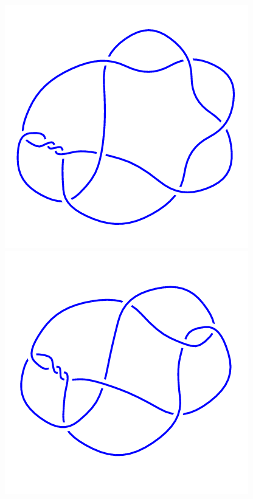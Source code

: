 \begin{figure}[H]
	\begin{minipage}[b]{.18\linewidth}
		\centering
		\includegraphics[width=\linewidth]{../data/10_17.png}
	\end{minipage}
	\begin{minipage}[b]{.18\linewidth}
		\centering
		\includegraphics[width=\linewidth]{../data/10_18.png}

\end{minipage}
\end{figure}
